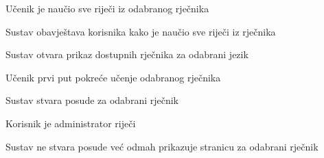 \begin{packed_item}
\begin{packed_item}
\begin{packed_enum}
							\end{packed_enum}
							
							\item[1.c] Učenik je naučio sve riječi iz odabranog rječnika
							\item[] \begin{packed_enum}
								
								\item Sustav obavještava korisnika kako je naučio sve riječi iz rječnika
								\item Sustav otvara prikaz dostupnih rječnika za odabrani jezik
								
							\end{packed_enum}
							
							\item[2.a] Učenik prvi put pokreće učenje odabranog rječnika
							\item[] \begin{packed_enum}
								
								\item Sustav stvara posude za odabrani rječnik
								
							\end{packed_enum}
							
							\item[2.b] Korisnik je administrator riječi
							\item[] \begin{packed_enum}
								
								\item Sustav ne stvara posude već odmah prikazuje stranicu za odabrani rječnik
								
							\end{packed_enum}
							
						\end{packed_item}
					\end{packed_item}
					
